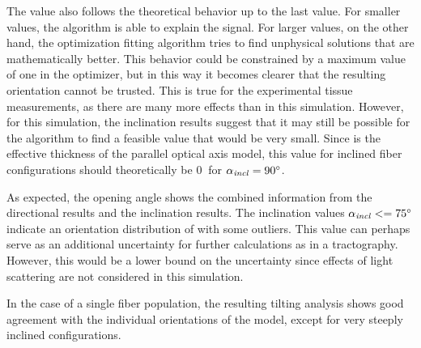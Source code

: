 \par
%
The \trel{} value also follows the theoretical behavior up to the last value.
For smaller \trel{} values, the algorithm is able to explain the signal.
For larger \trel{} values, on the other hand, the optimization fitting algorithm tries to find unphysical solutions that are mathematically better.
This behavior could be constrained by a maximum \trel{} value of one in the optimizer, but in this way it becomes clearer that the resulting orientation cannot be trusted.
This is true for the experimental tissue measurements, as there are many more effects than in this simulation.
However, for this simulation, the inclination results suggest that it may still be possible for the algorithm to find a feasible \trel{} value that would be very small.
Since \trel{} is the effective thickness of the parallel optical axis model, this value for inclined fiber configurations should theoretically be $\SI{0}{}$ for $\textnormal{$\alpha_{\mathit{incl}}$}=\SI{90}{\degree}$.
\par
%
As expected, the opening angle shows the combined information from the directional results and the inclination results.
The inclination values $\textnormal{$\alpha_{\mathit{incl}}$} <= \SI{75}{\degree}$ indicate an orientation distribution of \dummy{} with some outliers.
This value can perhaps serve as an additional uncertainty for further calculations as in a tractography.
However, this would be a lower bound on the uncertainty since effects of light scattering are not considered in this simulation.
\par
%
In the case of a single fiber population, the resulting tilting analysis shows good agreement with the individual orientations of the model, except for very steeply inclined configurations.
%
